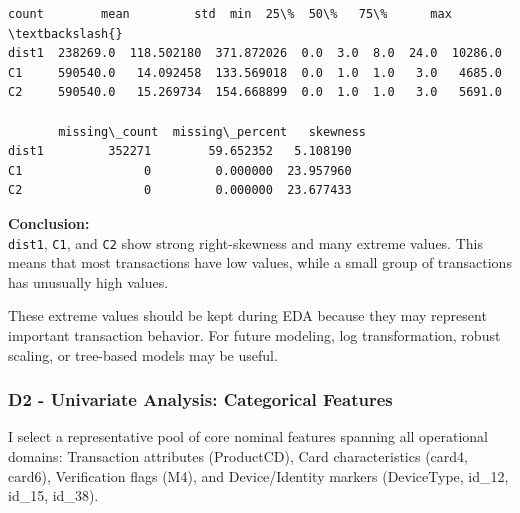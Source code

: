 \documentclass[11pt]{article}
\begin{document}
    
    \begin{Verbatim}[commandchars=\\\{\}]
          count        mean         std  min  25\%  50\%   75\%      max  \textbackslash{}
dist1  238269.0  118.502180  371.872026  0.0  3.0  8.0  24.0  10286.0   
C1     590540.0   14.092458  133.569018  0.0  1.0  1.0   3.0   4685.0   
C2     590540.0   15.269734  154.668899  0.0  1.0  1.0   3.0   5691.0   

       missing\_count  missing\_percent   skewness  
dist1         352271        59.652352   5.108190  
C1                 0         0.000000  23.957960  
C2                 0         0.000000  23.677433  
    \end{Verbatim}

    
    \textbf{Conclusion:}\\
\texttt{dist1}, \texttt{C1}, and \texttt{C2} show strong right-skewness
and many extreme values. This means that most transactions have low
values, while a small group of transactions has unusually high values.

These extreme values should be kept during EDA because they may
represent important transaction behavior. For future modeling, log
transformation, robust scaling, or tree-based models may be useful.

    \subsubsection{D2 - Univariate Analysis: Categorical
Features}\label{d2---univariate-analysis-categorical-features}

    I select a representative pool of core nominal features spanning all
operational domains: Transaction attributes (ProductCD), Card
characteristics (card4, card6), Verification flags (M4), and
Device/Identity markers (DeviceType, id\_12, id\_15, id\_38).
\end{document}
